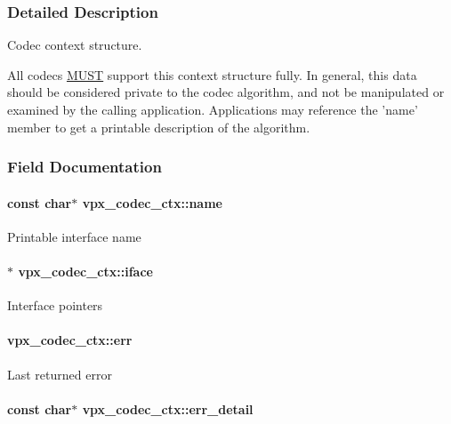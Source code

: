 \subsubsection{\-Detailed \-Description}
\-Codec context structure. 

\-All codecs \hyperlink{rfc2119_MUST}{\-M\-U\-S\-T} support this context structure fully. \-In general, this data should be considered private to the codec algorithm, and not be manipulated or examined by the calling application. \-Applications may reference the 'name' member to get a printable description of the algorithm. 

\subsubsection{\-Field \-Documentation}
\hypertarget{structvpx__codec__ctx_a7ed1bf8f6434ea2df01da8011849c6cb}{
\paragraph[{name}]{\setlength{\rightskip}{0pt plus 5cm}const char$\ast$ {\bf vpx\-\_\-codec\-\_\-ctx\-::name}}}
\label{structvpx__codec__ctx_a7ed1bf8f6434ea2df01da8011849c6cb}
\-Printable interface name \hypertarget{structvpx__codec__ctx_af5986790e3420beda77f3a9b64f6b953}{
\paragraph[{iface}]{$\ast$ {\bf vpx\-\_\-codec\-\_\-ctx\-::iface}}}
\label{structvpx__codec__ctx_af5986790e3420beda77f3a9b64f6b953}
\-Interface pointers \hypertarget{structvpx__codec__ctx_a6f448802b0675013fd8c5179675c30de}{
\paragraph[{err}]{ {\bf vpx\-\_\-codec\-\_\-ctx\-::err}}}
\label{structvpx__codec__ctx_a6f448802b0675013fd8c5179675c30de}
\-Last returned error \hypertarget{structvpx__codec__ctx_ad785c88ae862dd9129965c72723260bd}{
\paragraph[{err\-\_\-detail}]{\setlength{\rightskip}{0pt plus 5cm}const char$\ast$ {\bf vpx\-\_\-codec\-\_\-ctx\-::err\-\_\-detail}}}

